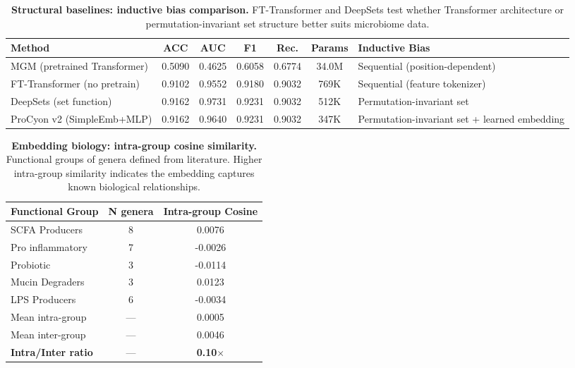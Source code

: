 \begin{table}[t]
\centering
\caption{\textbf{Structural baselines: inductive bias comparison.}
FT-Transformer and DeepSets test whether Transformer architecture
or permutation-invariant set structure better suits microbiome data.}
\label{tab:structural}
\begin{tabular}{lcccccl}
\toprule
\textbf{Method} & \textbf{ACC} & \textbf{AUC} & \textbf{F1} & \textbf{Rec.} & \textbf{Params} & \textbf{Inductive Bias} \\
\midrule
  MGM (pretrained Transformer) & 0.5090 & 0.4625 & 0.6058 & 0.6774 & 34.0M & Sequential (position-dependent) \\
  FT-Transformer (no pretrain) & 0.9102 & 0.9552 & 0.9180 & 0.9032 & 769K & Sequential (feature tokenizer) \\
  DeepSets (set function) & 0.9162 & 0.9731 & 0.9231 & 0.9032 & 512K & Permutation-invariant set \\
  ProCyon v2 (SimpleEmb+MLP) & 0.9162 & 0.9640 & 0.9231 & 0.9032 & 347K & Permutation-invariant set + learned embedding \\
\bottomrule
\end{tabular}
\end{table}
\begin{table}[t]
\centering
\caption{\textbf{Embedding biology: intra-group cosine similarity.}
Functional groups of genera defined from literature. Higher intra-group
similarity indicates the embedding captures known biological relationships.}
\label{tab:biology}
\begin{tabular}{lcc}
\toprule
\textbf{Functional Group} & \textbf{N genera} & \textbf{Intra-group Cosine} \\
\midrule
  SCFA Producers & 8 & 0.0076 \\
  Pro inflammatory & 7 & -0.0026 \\
  Probiotic & 3 & -0.0114 \\
  Mucin Degraders & 3 & 0.0123 \\
  LPS Producers & 6 & -0.0034 \\
\midrule
  Mean intra-group & — & 0.0005 \\
  Mean inter-group & — & 0.0046 \\
  \textbf{Intra/Inter ratio} & — & \textbf{0.10$\times$} \\
\bottomrule
\end{tabular}
\end{table}